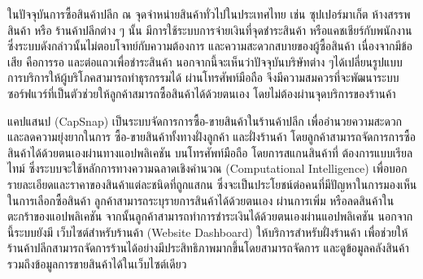 \maketitle
\makesignature

\ifproject
  \begin{abstractTH}
    \enskip ในปัจจุบันการซื้อสินค้าปลีก ณ จุดจำหน่ายสินค้าทั่วไปในประเทศไทย เช่น ซุปเปอร์มาเก็ต ห้างสรรพสินค้า หรือ ร้านค้าปลีกต่าง ๆ นั้น
    มีการใช้ระบบการจ่ายเงินที่จุดชำระสินค้า หรือแคชเชียร์กับพนักงาน ซึ่งระบบดังกล่าวนั้นไม่ตอบโจทย์กับความต้องการ และความสะดวกสบายของผู้ซื้อสินค้า
    เนื่องจากมีข้อเสีย คือการรอ และต่อแถวเพื่อชำระสินค้า  นอกจากนี้จะเห็นว่าปัจจุบันบริษัทต่าง ๆได้เปลี่ยนรูปแบบการบริการให้ผู้บริโภคสามารถทำธุรกรรมได้
    ผ่านโทรศัพท์มือถือ จึงมีความสมควรที่จะพัฒนาระบบซอร์ฟแวร์ที่เป็นตัวช่วยให้ลูกค้าสมารถซื้อสินค้าได้ด้วยตนเอง โดยไม่ต้องผ่านจุดบริการของร้านค้า

    \enskip    แคปแสนป (CapSnap) เป็นระบบจัดการการซื้อ-ขายสินค้าในร้านค้าปลีก เพื่ออำนวยความสะดวก และลดความยุ่งยากในการ
    ซื้อ-ขายสินค้าทั้งทางฝั่งลูกค้า และฝั่งร้านค้า โดยลูกค้าสามารถจัดการการซื้อสินค้าได้ด้วยตนเองผ่านทางแอปพลิเคชัน
    บนโทรศัพท์มือถือ โดยการสแกนสินค้าที่
    ต้องการแบบเรียลไทม์ ซึ่งระบบจะใช้หลักการทางความฉลาดเชิงคำนวณ (Computational Intelligence) เพื่อบอกรายละเอียดและราคาของสินค้าแต่ละชนิดที่ถูกแสกน
    \enskip ซึ่งจะเป็นประโยชน์ต่อคนที่มีปัญหาในการมองเห็นในการเลือกซื้อสินค้า ลูกค้าสามารถระบุรายการสินค้าได้ด้วยตนเอง
    ผ่านการเพิ่ม หรือลดสินค้าในตะกร้าของแอปพลิเคชัน จากนั้นลูกค้าสามารถทําการชําระเงินได้ด้วยตนเองผ่านแอปพลิเคชัน นอกจากนี้ระบบยังมี
    \enskip เว็บไซต์สำหรับร้านค้า (Website Dashboard) ให้บริการสําหรับฝั่งร้านค้า เพื่อช่วยให้ร้านค้าปลีกสามารถจัดการร้านได้อย่างมีประสิทธิภาพมากขึ้นโดยสามารถจัดการ
    และดูข้อมูลคลังสินค้า รวมถึงข้อมูลการขายสินค้าได้ในเว็บไซต์เดียว

  \end{abstractTH}

